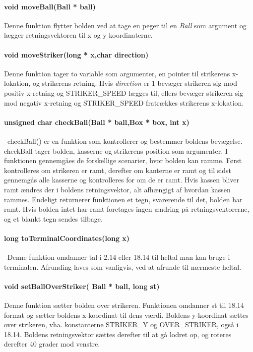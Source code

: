 \paragraph{void moveBall(Ball * ball)}
Denne funktion flytter bolden ved at tage en peger til en \textit{Ball} som argument og lægger retningsvektoren til x og y koordinaterne.
\paragraph{void moveStriker(long * x,char direction)}
Denne funktion tager to variable som argumenter, en pointer til strikerens x-lokation, og  strikerens retning. Hvis \textit{direction} er 1 bevæger strikeren sig mod positiv x-retning og STRIKER\_SPEED lægges til, ellers bevæger strikeren sig mod negativ x-retning og STRIKER\_SPEED fratrækkes strikerens x-lokation.
\paragraph{unsigned char checkBall(Ball * ball,Box * box,  int x)}\
checkBall() er en funktion som kontrollerer og bestemmer boldens bevægelse. checkBall tager bolden, kasserne og strikerens position som argumenter. I funktionen gennemgåes de forskellige scenarier, hvor bolden kan ramme. Først kontrolleres om strikeren er ramt, derefter om kanterne er ramt og til sidst gennemgås alle kasserne og kontrolleres for om de er ramt. Hvis kassen bliver ramt ændres der i boldens retningsvektor, alt afhængigt af hvordan kassen rammes. Endeligt returnerer funktionen et tegn, svarerende til det, bolden har ramt. Hvis bolden intet har ramt foretages ingen ændring på retningsvektorerne, og et blankt tegn sendes tilbage. 
\paragraph{long toTerminalCoordinates(long x)}\
Denne funktion omdanner tal i 2.14 eller 18.14 til heltal man kan bruge i terminalen. Afrunding laves som vanligvis, ved at afrunde til nærmeste heltal.

\paragraph{void setBallOverStriker( Ball * ball, long st)}
Denne funktion sætter bolden over strikeren.
Funktionen omdanner st til 18.14 format og sætter boldens x-koordinat til dens værdi.
Boldens y-koordinat sættes over strikeren, vha. konstanterne STRIKER\_Y og OVER\_STRIKER, også i 18.14. Boldens retningsvektor sættes derefter til at gå lodret op, og roteres derefter 40 grader mod venstre.
